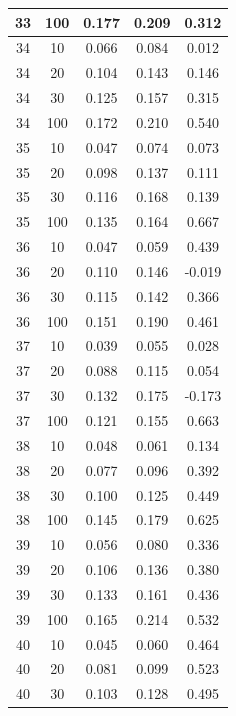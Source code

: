\begin{longtable}{ |c|c|c|c|c| }
            33 & 100 & 0.177 & 0.209 & 0.312 \\ \hline
            34 & 10 & 0.066 & 0.084 & 0.012 \\ \hline
            34 & 20 & 0.104 & 0.143 & 0.146 \\ \hline
            34 & 30 & 0.125 & 0.157 & 0.315 \\ \hline
            34 & 100 & 0.172 & 0.210 & 0.540 \\ \hline
            35 & 10 & 0.047 & 0.074 & 0.073 \\ \hline
            35 & 20 & 0.098 & 0.137 & 0.111 \\ \hline
            35 & 30 & 0.116 & 0.168 & 0.139 \\ \hline
            35 & 100 & 0.135 & 0.164 & 0.667 \\ \hline
            36 & 10 & 0.047 & 0.059 & 0.439 \\ \hline
            36 & 20 & 0.110 & 0.146 & -0.019 \\ \hline
            36 & 30 & 0.115 & 0.142 & 0.366 \\ \hline
            36 & 100 & 0.151 & 0.190 & 0.461 \\ \hline
            37 & 10 & 0.039 & 0.055 & 0.028 \\ \hline
            37 & 20 & 0.088 & 0.115 & 0.054 \\ \hline
            37 & 30 & 0.132 & 0.175 & -0.173 \\ \hline
            37 & 100 & 0.121 & 0.155 & 0.663 \\ \hline
            38 & 10 & 0.048 & 0.061 & 0.134 \\ \hline
            38 & 20 & 0.077 & 0.096 & 0.392 \\ \hline
            38 & 30 & 0.100 & 0.125 & 0.449 \\ \hline
            38 & 100 & 0.145 & 0.179 & 0.625 \\ \hline
            39 & 10 & 0.056 & 0.080 & 0.336 \\ \hline
            39 & 20 & 0.106 & 0.136 & 0.380 \\ \hline
            39 & 30 & 0.133 & 0.161 & 0.436 \\ \hline
            39 & 100 & 0.165 & 0.214 & 0.532 \\ \hline
            40 & 10 & 0.045 & 0.060 & 0.464 \\ \hline
            40 & 20 & 0.081 & 0.099 & 0.523 \\ \hline
            40 & 30 & 0.103 & 0.128 & 0.495 \\ \hline

\end{longtable}
